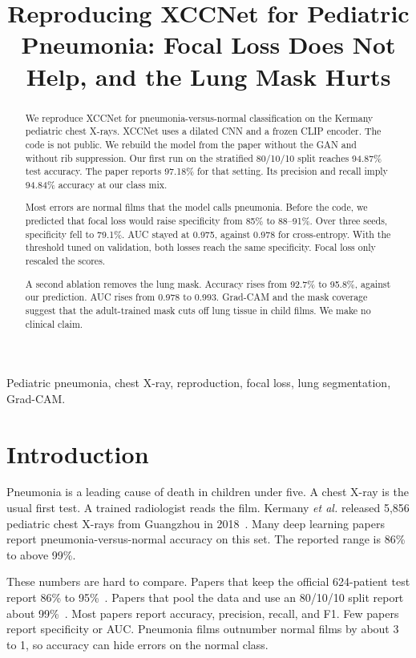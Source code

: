 \documentclass[conference]{IEEEtran}
\begin{document}
\title{Reproducing XCCNet for Pediatric Pneumonia: Focal Loss Does Not Help, and the Lung Mask Hurts}
\author{}
\maketitle

\begin{abstract}
We reproduce XCCNet for pneumonia-versus-normal classification on the Kermany pediatric chest X-rays. XCCNet uses a dilated CNN and a frozen CLIP encoder. The code is not public. We rebuild the model from the paper without the GAN and without rib suppression. Our first run on the stratified 80/10/10 split reaches 94.87\% test accuracy. The paper reports 97.18\% for that setting. Its precision and recall imply 94.84\% accuracy at our class mix.

Most errors are normal films that the model calls pneumonia. Before the code, we predicted that focal loss would raise specificity from 85\% to 88--91\%. Over three seeds, specificity fell to 79.1\%. AUC stayed at 0.975, against 0.978 for cross-entropy. With the threshold tuned on validation, both losses reach the same specificity. Focal loss only rescaled the scores.

A second ablation removes the lung mask. Accuracy rises from 92.7\% to 95.8\%, against our prediction. AUC rises from 0.978 to 0.993. Grad-CAM and the mask coverage suggest that the adult-trained mask cuts off lung tissue in child films. We make no clinical claim.
\end{abstract}
\begin{IEEEkeywords}
Pediatric pneumonia, chest X-ray, reproduction, focal loss, lung segmentation, Grad-CAM.
\end{IEEEkeywords}

\section{Introduction}
Pneumonia is a leading cause of death in children under five. A chest X-ray is the usual first test. A trained radiologist reads the film. Kermany \textit{et al.} released 5{,}856 pediatric chest X-rays from Guangzhou in 2018~\cite{kermany2018}. Many deep learning papers report pneumonia-versus-normal accuracy on this set. The reported range is 86\% to above 99\%.

These numbers are hard to compare. Papers that keep the official 624-patient test report 86\% to 95\%~\cite{kermany2018,rajaraman2018,salehi2021,ayan2021}. Papers that pool the data and use an 80/10/10 split report about 99\%~\cite{raghaw2024,choudhury2026}. Most papers report accuracy, precision, recall, and F1. Few papers report specificity or AUC. Pneumonia films outnumber normal films by about 3 to 1, so accuracy can hide errors on the normal class.
\end{document}
